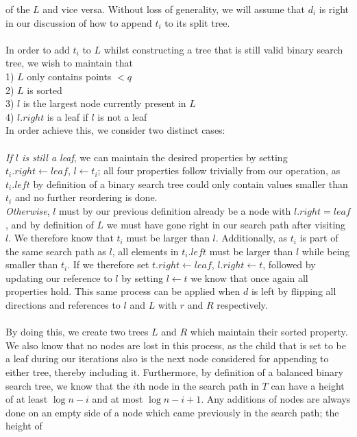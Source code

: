 \documentclass{article}
\begin{document}
of the $L$ and vice versa. Without loss of generality, we will assume that
$d_i$ is right in our discussion of how to append $t_i$ to its split tree. \\\\
In order to add $t_i$ to $L$ whilst constructing a tree that is still valid
binary search tree, we wish to maintain that \\ 1) $L$ only contains points $<
    q$ \\ 2) $L$ is sorted \\ 3) $l$ is the largest node currently present in $L$
\\ 4) $l.right$ is a leaf if $l$ is not a leaf \\ In order achieve this, we
consider two distinct cases: \\\\ \textit{If $l$ is still a leaf}, we can
maintain the desired properties by setting $t_i.right \leftarrow leaf$, $l
    \leftarrow t_i$; all four properties follow trivially from our operation, as
$t_i.left$ by definition of a binary search tree could only contain values
smaller than $t_i$ and no further reordering is done. \\ \textit{Otherwise},
$l$ must by our previous definition already be a node with $l.right = leaf$,
and by definition of $L$ we must have gone right in our search path after
visiting $l$. We therefore know that $t_i$ must be larger than $l$.
Additionally, as $t_i$ is part of the same search path as $l$, all elements in
$t_i.left$ must be larger than $l$ while being smaller than $t_i$. If we
therefore set $t.right \leftarrow leaf$, $l.right \leftarrow t$, followed by
updating our reference to $l$ by setting $l \leftarrow t$ we know that once
again all properties hold. This same process can be applied when $d$ is left by
flipping all directions and references to $l$ and $L$ with $r$ and $R$
respectively. \\\\ By doing this, we create two trees $L$ and $R$ which
maintain their sorted property. We also know that no nodes are lost in this
process, as the child that is set to be a leaf during our iterations also is
the next node considered for appending to either tree, thereby including it.
Furthermore, by definition of a balanced binary search tree, we know that the
$i$th node in the search path in $T$ can have a height of at least $\log n - i$
and at most $\log n - i + 1$. Any additions of nodes are always done on an
empty side of a node which came previously in the search path; the height of
\end{document}
